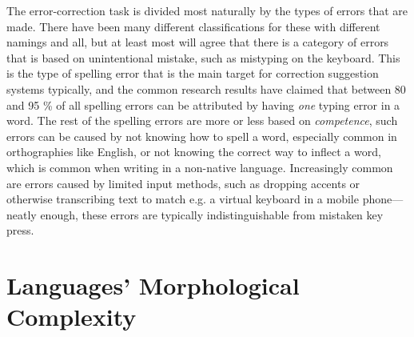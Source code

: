 \documentclass[officiallayout]{unihelcompling}
\begin{document}
The error-correction task is divided most naturally by the types of errors that
are made. There have been many different classifications for these with
different namings and all, but at least most will agree that there is a
category of errors that is based on unintentional mistake, such as
mistyping on the keyboard. This is the type of spelling error that is the
main target for correction suggestion systems typically, and the common
research results have claimed that between 80 and 95 \% of all spelling
errors can be attributed by having \emph{one} typing error in a 
word\citep{kukich1992techniques}. The rest of the spelling errors are more
or less based on \emph{competence}, such errors can be caused by not knowing
how to spell a word, especially common in orthographies like English, or not
knowing the correct way to inflect a word, which is common when writing in a
non-native language. Increasingly common are errors caused by limited input
methods, such as dropping accents or otherwise transcribing text to match e.g.
a virtual keyboard in a mobile phone---neatly enough, these errors are 
typically indistinguishable from mistaken key press.



\section{Languages' Morphological Complexity}
\label{sec:morphological-complexity}
\end{document}
